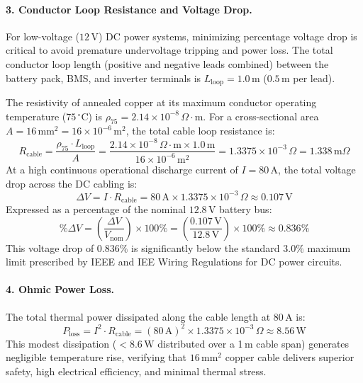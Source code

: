 \documentclass[12pt, a4paper]{report}
\begin{document}
{\paragraph{3. Conductor Loop Resistance and Voltage Drop.}
For low-voltage ($12\,\text{V}$) DC power systems, minimizing percentage voltage drop is critical to avoid premature undervoltage tripping and power loss. The total conductor loop length (positive and negative leads combined) between the battery pack, BMS, and inverter terminals is $L_{\text{loop}} = 1.0\,\text{m}$ ($0.5\,\text{m}$ per lead).

The resistivity of annealed copper at its maximum conductor operating temperature ($75\,^{\circ}\text{C}$) is $\rho_{75} = 2.14 \times 10^{-8}\,\Omega\cdot\text{m}$. For a cross-sectional area $A = 16\,\text{mm}^{2} = 16 \times 10^{-6}\,\text{m}^{2}$, the total cable loop resistance is:
\begin{equation}
    R_{\text{cable}} = \frac{\rho_{75} \cdot L_{\text{loop}}}{A} = \frac{2.14 \times 10^{-8}\,\Omega\cdot\text{m} \times 1.0\,\text{m}}{16 \times 10^{-6}\,\text{m}^{2}} = 1.3375 \times 10^{-3}\,\Omega = 1.338\,\text{m}\Omega
    \label{eq:rcable}
\end{equation}
At a high continuous operational discharge current of $I = 80\,\text{A}$, the total voltage drop across the DC cabling is:
\begin{equation}
    \Delta V = I \cdot R_{\text{cable}} = 80\,\text{A} \times 1.3375 \times 10^{-3}\,\Omega \approx 0.107\,\text{V}
    \label{eq:vdrop}
\end{equation}
Expressed as a percentage of the nominal $12.8\,\text{V}$ battery bus:
\begin{equation}
    \%\Delta V = \left(\frac{\Delta V}{V_{\text{nom}}}\right) \times 100\% = \left(\frac{0.107\,\text{V}}{12.8\,\text{V}}\right) \times 100\% \approx 0.836\%
    \label{eq:pvdrop}
\end{equation}
This voltage drop of $0.836\%$ is significantly below the standard $3.0\%$ maximum limit prescribed by IEEE and IEE Wiring Regulations for DC power circuits.

\paragraph{4. Ohmic Power Loss.}
The total thermal power dissipated along the cable length at $80\,\text{A}$ is:
\begin{equation}
    P_{\text{loss}} = I^{2} \cdot R_{\text{cable}} = (80\,\text{A})^{2} \times 1.3375 \times 10^{-3}\,\Omega \approx 8.56\,\text{W}
    \label{eq:ploss}
\end{equation}
This modest dissipation ($<8.6\,\text{W}$ distributed over a 1\,m cable span) generates negligible temperature rise, verifying that $16\,\text{mm}^{2}$ copper cable delivers superior safety, high electrical efficiency, and minimal thermal stress.

}
\end{document}

